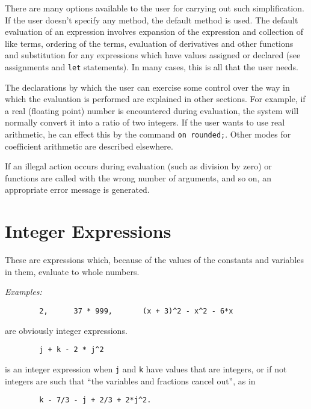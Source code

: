 There are many options available to the user for carrying out such
simplification.  If the user doesn't specify any
method, the default method is used.  The default evaluation of an
expression involves expansion of the expression and collection of like
terms, ordering of the terms, evaluation of derivatives and other
functions and substitution for any expressions which have values assigned
or declared (see assignments and \texttt{let} statements).  In many cases,
this is all that the user needs.

The declarations by which the user can exercise some control over the way
in which the evaluation is performed are explained in other sections.  For
example, if a real (floating point) number is encountered during
evaluation, the system will normally convert it into a ratio of two
integers.  If the user wants to use real arithmetic, he can effect this by
the command \texttt{on rounded;}. Other modes for
coefficient arithmetic are described elsewhere.

If an illegal action occurs during evaluation (such as division by zero)
or functions are called with the wrong number of arguments, and so on, an
appropriate error message is generated.

\section{Integer Expressions}

These are expressions which, because of the values of the
constants and variables in them, evaluate to whole numbers.

\textit{Examples:}
\begin{verbatim}
        2,      37 * 999,       (x + 3)^2 - x^2 - 6*x
\end{verbatim}
are obviously integer expressions.
\begin{verbatim}
        j + k - 2 * j^2
\end{verbatim}
is an integer expression when \texttt{j} and \texttt{k} have values that are
integers, or if not integers are such that ``the variables and fractions
cancel out'', as in
\begin{verbatim}
        k - 7/3 - j + 2/3 + 2*j^2.
\end{verbatim}

